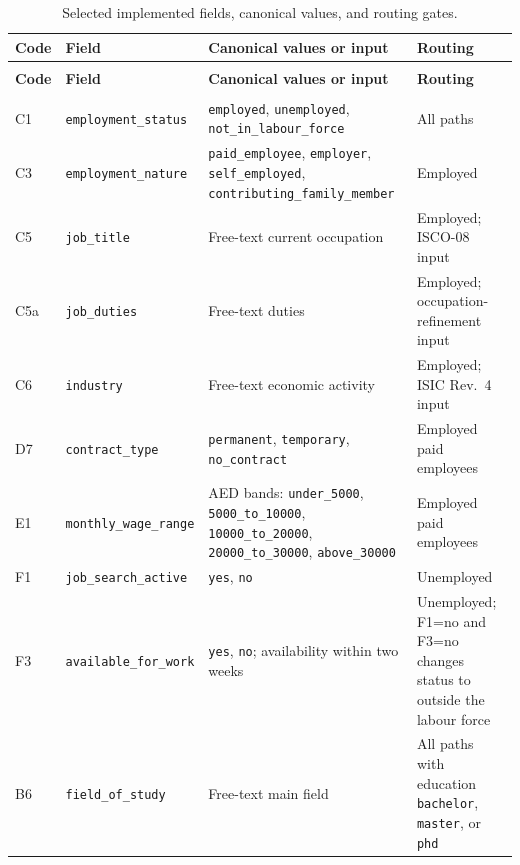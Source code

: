 \begin{longtable}{@{}>{\raggedright\arraybackslash}p{}>{\raggedright\arraybackslash}p{}
                       >{\raggedright\arraybackslash}p{}>{\raggedright\arraybackslash}p{}@{}}
\caption{Selected implemented fields, canonical values, and routing gates.}
\label{tab:app-questionnaire}\\
\toprule
\textbf{Code} & \textbf{Field} & \textbf{Canonical values or input} &
\textbf{Routing} \\
\midrule
\endfirsthead
\multicolumn{4}{c}{\tablename\ \thetable{} --- continued} \\
\toprule
\textbf{Code} & \textbf{Field} & \textbf{Canonical values or input} &
\textbf{Routing} \\
\midrule
\endhead
\midrule
\multicolumn{4}{r}{\small Continued on the next page} \\
\endfoot
\bottomrule
\endlastfoot
C1 & \texttt{employment\_status} &
  \texttt{employed}, \texttt{unemployed},
  \texttt{not\_in\_labour\_force} & All paths \\
C3 & \texttt{employment\_nature} &
  \texttt{paid\_employee}, \texttt{employer}, \texttt{self\_employed},
  \texttt{contributing\_family\_member} & Employed \\
C5 & \texttt{job\_title} & Free-text current occupation &
  Employed; ISCO-08 input \\
C5a & \texttt{job\_duties} & Free-text duties &
  Employed; occupation-refinement input \\
C6 & \texttt{industry} & Free-text economic activity &
  Employed; ISIC Rev.~4 input \\
D7 & \texttt{contract\_type} &
  \texttt{permanent}, \texttt{temporary}, \texttt{no\_contract} &
  Employed paid employees \\
E1 & \texttt{monthly\_wage\_range} &
  AED bands: \texttt{under\_5000}, \texttt{5000\_to\_10000},
  \texttt{10000\_to\_20000}, \texttt{20000\_to\_30000},
  \texttt{above\_30000} & Employed paid employees \\
F1 & \texttt{job\_search\_active} & \texttt{yes}, \texttt{no} &
  Unemployed \\
F3 & \texttt{available\_for\_work} &
  \texttt{yes}, \texttt{no}; availability within two weeks &
  Unemployed; F1=no and F3=no changes status to outside the labour force \\
B6 & \texttt{field\_of\_study} & Free-text main field &
  All paths with education \texttt{bachelor}, \texttt{master}, or \texttt{phd} \\
\end{longtable}
\endgroup

